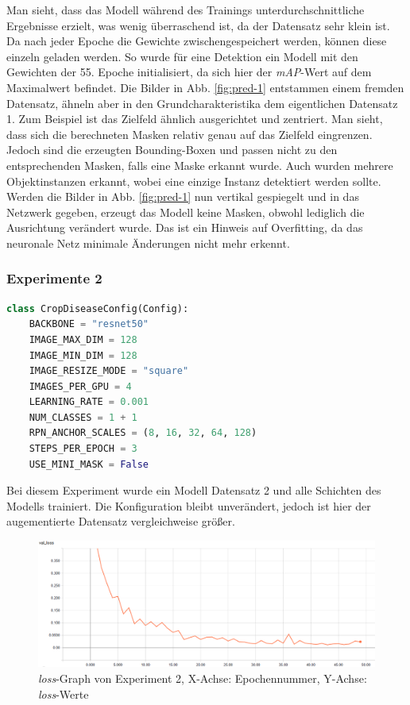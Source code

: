 \noindent
Man sieht, dass das Modell während des Trainings unterdurchschnittliche Ergebnisse erzielt, was wenig überraschend ist, da der Datensatz sehr klein ist. Da nach jeder Epoche die Gewichte zwischengespeichert werden, können diese einzeln geladen werden. So wurde für eine Detektion ein Modell mit den Gewichten der 55. Epoche initialisiert, da sich hier der \textit{mAP}-Wert auf dem Maximalwert befindet. Die Bilder in Abb. \ref{fig:pred-1} entstammen einem fremden Datensatz, ähneln aber in den Grundcharakteristika dem eigentlichen Datensatz 1. Zum Beispiel ist das Zielfeld ähnlich ausgerichtet und zentriert. Man sieht, dass sich die berechneten Masken relativ genau auf das Zielfeld eingrenzen. Jedoch sind die erzeugten Bounding-Boxen und passen nicht zu den entsprechenden Masken, falls eine Maske erkannt wurde. Auch wurden mehrere Objektinstanzen erkannt, wobei eine einzige Instanz detektiert werden sollte. Werden die Bilder in Abb. \ref{fig:pred-1} nun vertikal gespiegelt und in das Netzwerk gegeben, erzeugt das Modell keine Masken, obwohl lediglich die Ausrichtung verändert wurde. Das ist ein Hinweis auf Overfitting, da das neuronale Netz minimale Änderungen nicht mehr erkennt.

\subsubsection{Experimente 2}\label{sub:sub:sec:experiment-2}

\begin{lstlisting}[language=python,caption={Konfiguration für Experimente 2},captionpos=b]
class CropDiseaseConfig(Config):
    BACKBONE = "resnet50"
    IMAGE_MAX_DIM = 128
    IMAGE_MIN_DIM = 128
    IMAGE_RESIZE_MODE = "square"
    IMAGES_PER_GPU = 4
    LEARNING_RATE = 0.001
    NUM_CLASSES = 1 + 1
    RPN_ANCHOR_SCALES = (8, 16, 32, 64, 128)
    STEPS_PER_EPOCH = 3
    USE_MINI_MASK = False
\end{lstlisting}
\noindent
Bei diesem Experiment wurde ein Modell Datensatz 2 und alle Schichten des Modells trainiert. Die Konfiguration bleibt unverändert, jedoch ist hier der augementierte Datensatz vergleichweise größer.

\begin{figure}[ht]
	\centering
    \includegraphics[width=.7\textwidth]{pics/val-loss-2.PNG}
    \caption{\textit{loss}-Graph von Experiment 2, X-Achse: Epochennummer, Y-Achse: \textit{loss}-Werte}
    \label{fig:map-2}
\end{figure}

